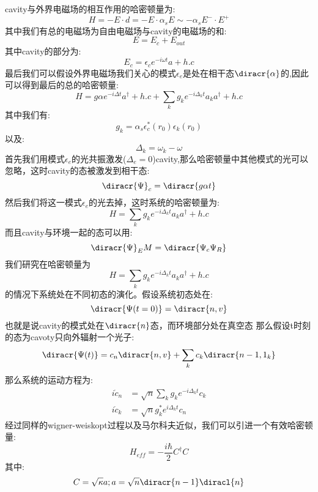 cavity与外界电磁场的相互作用的哈密顿量为:
\[H=-E\cdot d=-E\cdot \alpha_s E\sim -\alpha_s E^-\cdot E^+\]
其中我们有总的电磁场为自由电磁场与cavity的电磁场的和:
\[E=E_c+E_{out}\]
其中cavity的部分为:
\[E_c=\epsilon_ce^{-i\omega t}a+h.c\]
最后我们可以假设外界电磁场我们关心的模式$\epsilon_e$是处在相干态$\diracr{\alpha}$的,因此可以得到最后的总的哈密顿量:
\[H=g\alpha e^{-i\Delta t}a^\dagger +h.c +\sum_k g_ke^{-i\Delta_k t}a_ka^\dagger+h.c\]
其中我们有:
\[g_k=\alpha_s \epsilon^*_c(r_0)\epsilon_k(r_0)\]
以及:
\[\Delta_k=\omega_k-\omega\]
首先我们用模式$\epsilon_e$的光共振激发($\Delta_e=0$)cavity,那么哈密顿量中其他模式的光可以忽略，这时cavity的态被激发到相干态:
\[\diracr{\Psi}_c=\diracr{g\alpha t}\]
然后我们将这一模式$\epsilon_e$的光去掉，这时系统的哈密顿量为:
\[H=\sum_k g_ke^{-i\Delta_k t}a_ka^\dagger+h.c\]
而且cavity与环境一起的态可以用:
\[\diracr{\Psi}_EM=\diracr{\Psi_c\Psi_R}\]
我们研究在哈密顿量为\[H=\sum_k g_ke^{-i\Delta_k t}a_ka^\dagger+h.c\]的情况下系统处在不同初态的演化。假设系统初态处在:
\[\diracr{\Psi(t=0)}=\diracr{n,v}\]
也就是说cavity的模式处在$\diracr{n}$态，而环境部分处在真空态
那么假设t时刻的态为cavoty只向外辐射一个光子:
\[\diracr{\Psi(t)}=c_n\diracr{n,v}+\sum_kc_k\diracr{n-1,1_k}\]
那么系统的运动方程为:
\begin{align}
i\dot{c}_n&=\sqrt{n}\sum_kg_ke^{-i\Delta_k t}c_k\\
i\dot{c}_k&=\sqrt{n}g^*_ke^{i\Delta_k t}c_n
\end{align}
经过同样的wigner-weiskopt过程以及马尔科夫近似，我们可以引进一个有效哈密顿量:
\[H_{eff}=-\frac{i\hbar}{2}C^\dagger C\]
其中:
\[C=\sqrt{\kappa}a;a=\sqrt{n}\diracr{n-1}\diracl{n}\]